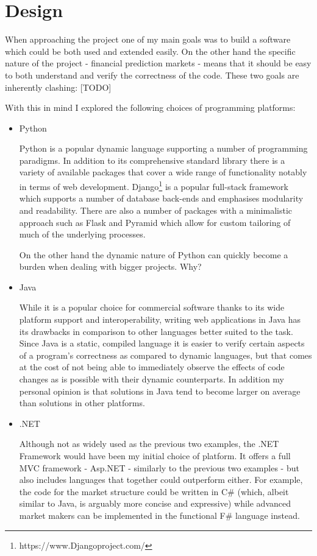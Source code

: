 \documentclass[bsc,frontabs,twoside,singlespacing,parskip,deptreport]{infthesis}     %
\begin{document}
\section{Design}

    When approaching the project one of my main goals was to build a software which could be both used and extended easily. On the other hand the specific nature of the project - financial prediction markets - means that it should be easy to both understand and verify the correctness of the code. These two goals are inherently clashing: [TODO]
    
With this in mind I explored the following choices of programming platforms:

\begin{itemize}
\item Python

Python is a popular dynamic language supporting a number of programming paradigms. In addition to its comprehensive standard library there is a variety of available packages that cover a wide range of functionality notably in terms of web development. Django\footnote{https://www.Djangoproject.com/} is a popular full-stack framework which supports a number of database back-ends and emphasises modularity and readability. There are also a number of packages with a minimalistic approach such as Flask and Pyramid which allow for custom tailoring of much of the underlying processes.

On the other hand the dynamic nature of Python can quickly become a burden when dealing with bigger projects. Why?

\item Java

While it is a popular choice for commercial software thanks to its wide platform support and interoperability, writing web applications in Java has its drawbacks in comparison to other languages better suited to the task. Since Java is a static, compiled language it is easier to verify certain aspects of a program's correctness as compared to dynamic languages, but that comes at the cost of not being able to immediately observe the effects of code changes as is possible with their dynamic counterparts. In addition my personal opinion is that solutions in Java tend to become larger on average than solutions in other platforms.

\item .NET

    Although not as widely used as the previous two examples, the .NET Framework would have been my initial choice of platform. It offers a full MVC framework - Asp.NET -  similarly to the previous two examples - but also includes languages that together could outperform either. For example, the code for the market structure could be written in C\# (which, albeit similar to Java, is arguably more concise and expressive) while advanced market makers can be implemented in the functional F\# language instead.


\end{itemize}
\end{document}
